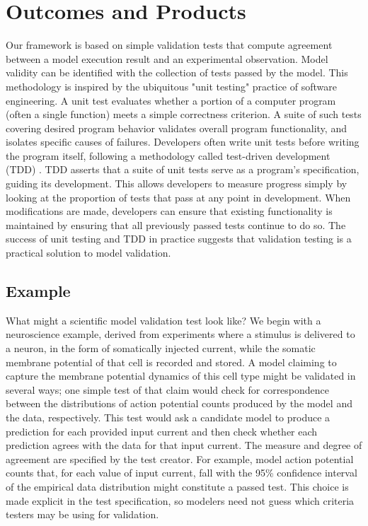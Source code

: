 \documentclass[11pt,letterpaper]{article}
\begin{document}
\section{Outcomes and Products}
Our framework is based on simple validation tests that compute agreement between a model execution result and an experimental observation. Model validity can be identified with the collection of tests passed by the model. This methodology is inspired by the ubiquitous "unit testing" practice of software engineering. A unit test evaluates whether a portion of a computer program (often a single function) meets a simple correctness criterion. A suite of such tests covering desired program behavior validates overall program functionality, and isolates specific causes of failures. Developers often write unit tests before writing the program itself, following a methodology called test-driven development (TDD) \cite{beck2002}. TDD asserts that a suite of unit tests serve as a program's specification, guiding its development. This allows developers to measure progress simply by looking at the proportion of tests that pass at any point in development. When modifications are made, developers can ensure that existing functionality is maintained by ensuring that all previously passed tests continue to do so.  The success of unit testing and TDD in practice suggests that validation testing is a practical solution to model validation. 

\subsection{Example} What might a scientific model validation test look like?  We begin with a neuroscience example, derived from experiments where a stimulus is delivered to a neuron, in the form of somatically injected current, while the somatic membrane potential of that cell is recorded and stored.  A model claiming to capture the membrane potential dynamics of this cell type might be validated in several ways; one simple test of that claim would check for correspondence between the distributions of action potential counts produced by the model and the data, respectively. This test would ask a candidate model to produce a prediction for each provided input current and then check whether each prediction agrees with the data for that input current.  The measure and degree of agreement are specified by the test creator.  For example, model action potential counts that, for each value of input current, fall with the 95\% confidence interval of the empirical data distribution might constitute a passed test. This choice is made explicit in the test specification, so modelers need not guess which criteria testers may be using for validation.
\end{document}
